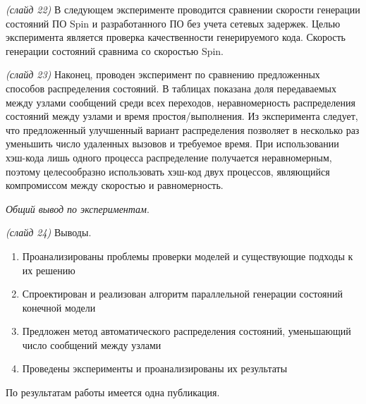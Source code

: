 \documentclass[a4paper,12pt,notitlepage]{article}
\begin{document}
\emph{(слайд 22)} В следующем эксперименте проводится сравнении скорости генерации
состояний ПО Spin и разработанного ПО без учета сетевых задержек. Целью эксперимента
является проверка качественности генерируемого кода. Скорость генерации состояний сравнима
со скоростью Spin.

\emph{(слайд 23)} Наконец, проводен эксперимент по сравнению предложенных способов
распределения состояний. В таблицах показана доля передаваемых между узлами сообщений
среди всех переходов, неравномерность распределения состояний между узлами и время
простоя/выполнения. Из эксперимента следует, что предложенный улучшенный вариант
распределения позволяет в несколько раз уменьшить число удаленных вызовов и требуемое
время. При использовании хэш-кода лишь одного процесса распределение получается
неравномерным, поэтому целесообразно использовать хэш-код двух процессов, являющийся
компромиссом между скоростью и равномерность.

\emph{Общий вывод по экспериментам}.

\emph{(слайд 24)} Выводы. 
\begin{enumerate}
\item Проанализированы проблемы проверки моделей и существующие подходы к их решению
\item Спроектирован и реализован алгоритм параллельной генерации состояний конечной
  модели
\item Предложен метод автоматического распределения состояний, уменьшающий число сообщений
  между узлами
\item Проведены эксперименты и проанализированы их результаты
\end{enumerate}

По результатам работы имеется одна публикация.
\end{document}
